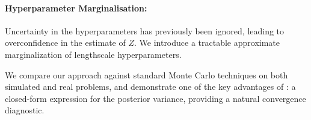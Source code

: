 \documentclass{article}
\begin{document}
\paragraph*{Hyperparameter Marginalisation:} Uncertainty in the hyperparameters has previously been ignored, leading to overconfidence in the estimate of $Z$.  We introduce a tractable approximate marginalization of lengthscale hyperparameters.


We compare our  approach against standard Monte Carlo techniques on both simulated and real problems, and demonstrate one of the key advantages of : a closed-form expression for the posterior variance, providing a natural convergence diagnostic. 





\end{document}
